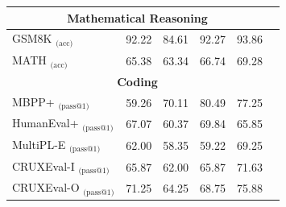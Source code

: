 \begin{table}[htbp]
{\begin{tabular}{l|ccc|cc}
        \midrule
        \multicolumn{5}{c}{\textbf{Mathematical Reasoning}} \\
        \midrule

        GSM8K $_{\text{(acc)}}$ & 92.22 & 84.61 & 92.27  & 93.86 \\
        MATH $_{\text{(acc)}}$ & 65.38 & 63.34 & 66.74 & 69.28 \\
        \midrule
        \multicolumn{5}{c}{\textbf{Coding}} \\
        \midrule
        MBPP+ $_{\text{(pass@1)}}$ & 59.26 & 70.11 & 80.49  & 77.25 \\
        HumanEval+ $_{\text{(pass@1)}}$  & 67.07 & 60.37  & 69.84  & 65.85 \\
        MultiPL-E $_{\text{(pass@1)}}$ & 62.00 & 58.35 & 59.22  & 69.25 \\
        CRUXEval-I $_{\text{(pass@1)}}$ & 65.87 & 62.00 & 65.87  & 71.63  \\
        CRUXEval-O $_{\text{(pass@1)}}$ & 71.25 & 64.25 & 68.75  & 75.88 \\
        \bottomrule
    \end{tabular}
    }
    
    \label{tab:base_model_results}
\end{table}
 







